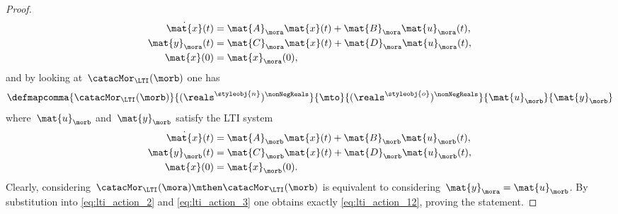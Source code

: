 \begin{proof}
    \begin{equation}
        \label{eq:lti_action_2}
        \begin{aligned}
            \dot{\mat{x}}(t) & =\mat{A}_{\mora}\mat{x}(t)+\mat{B}_{\mora}\mat{u}_\mora(t), \\
            \mat{y}_\mora(t) & =\mat{C}_{\mora}\mat{x}(t)+\mat{D}_{\mora}\mat{u}_\mora(t), \\
            \mat{x}(0)       & =\mat{x}_{\mora}(0),
        \end{aligned}
    \end{equation}
    and by looking at~$\catacMor_\LTI(\morb)$ one has
    \begin{equation*}
        \defmapcomma{\catacMor_\LTI(\morb)}{(\reals^\styleobj{n})^{\nonNegReals}}{\mto}{(\reals^\styleobj{o})^{\nonNegReals}}
        {\mat{u}_\morb}{\mat{y}_\morb}
    \end{equation*}
    where~$\mat{u}_\morb$ and~$\mat{y}_\morb$ satisfy the LTI system
    \begin{equation}
        \label{eq:lti_action_3}
        \begin{aligned}
            \dot{\mat{x}}(t) & =\mat{A}_{\morb}\mat{x}(t)+\mat{B}_{\morb}\mat{u}_\morb(t), \\
            \mat{y}_\morb(t) & =\mat{C}_{\morb}\mat{x}(t)+\mat{D}_{\morb}\mat{u}_\morb(t), \\
            \mat{x}(0)       & =\mat{x}_{\morb}(0).
        \end{aligned}
    \end{equation}
    Clearly, considering~$\catacMor_\LTI(\mora)\mthen \catacMor_\LTI(\morb)$ is equivalent to considering~$\mat{y}_\mora=\mat{u}_\morb$.
    By substitution into \cref{eq:lti_action_2} and \cref{eq:lti_action_3} one obtains exactly \cref{eq:lti_action_12}, proving the statement.
\end{proof}

